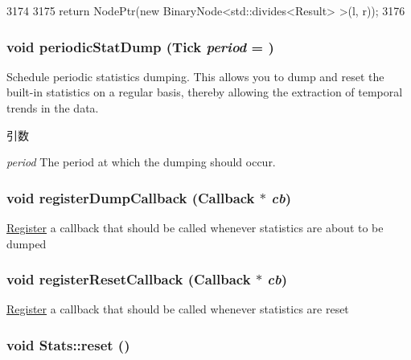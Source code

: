 \begin{DoxyCode}
3174 {
3175     return NodePtr(new BinaryNode<std::divides<Result> >(l, r));
3176 }
\end{DoxyCode}
\hypertarget{namespaceStats_a177a9c0907d7af207ceba422e0429cec}{
\subsubsection[{periodicStatDump}]{\setlength{\rightskip}{0pt plus 5cm}void periodicStatDump ({\bf Tick} {\em period} = {})}}
\label{namespaceStats_a177a9c0907d7af207ceba422e0429cec}
Schedule periodic statistics dumping. This allows you to dump and reset the built-\/in statistics on a regular basis, thereby allowing the extraction of temporal trends in the data. 
\begin{DoxyParams}{引数}
\item[{\em period}]The period at which the dumping should occur. \end{DoxyParams}
\hypertarget{namespaceStats_a4530b3818e2e1811b7ad063fe38bedc1}{
\subsubsection[{registerDumpCallback}]{\setlength{\rightskip}{0pt plus 5cm}void registerDumpCallback ({\bf Callback} $\ast$ {\em cb})}}
\label{namespaceStats_a4530b3818e2e1811b7ad063fe38bedc1}
\hyperlink{classRegister}{Register} a callback that should be called whenever statistics are about to be dumped \hypertarget{namespaceStats_a3b9643eddeef663a234d6cfa2bcf06f2}{
\subsubsection[{registerResetCallback}]{\setlength{\rightskip}{0pt plus 5cm}void registerResetCallback ({\bf Callback} $\ast$ {\em cb})}}
\label{namespaceStats_a3b9643eddeef663a234d6cfa2bcf06f2}
\hyperlink{classRegister}{Register} a callback that should be called whenever statistics are reset \hypertarget{namespaceStats_ab9cd159e7f4ac914ca3db1a14ff1d8a8}{
\subsubsection[{reset}]{\setlength{\rightskip}{0pt plus 5cm}void Stats::reset ()}}
\label{namespaceStats_ab9cd159e7f4ac914ca3db1a14ff1d8a8}


